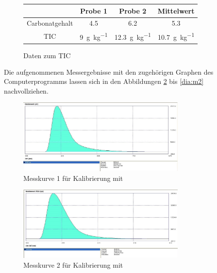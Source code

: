 \vspace*{-7mm}
\begin{figure}[h!]
	\renewcommand{\arraystretch}{1.2}
	\centering
	\caption{Daten zum TIC}
	\label{tab:tic}
	\begin{tabular}{c|c|c|c}
		\hline
		 					& \textbf{Probe 1} 			& \textbf{Probe 2}   		& \textbf{Mittelwert}\\
		\hline
		Carbonatgehalt		&	 \SI{4,5}{\mpercent}		&  \SI{6,2}{\mpercent}		& \SI{5,3}{\mpercent}\\
		TIC					&	\SI{9}{\gram \per \kg}	& \SI{12,3}{\gram \per \kg}	& \SI{10,7}{\gram \per \kg}  \\
		\hline
	\end{tabular}
\end{figure}
\FloatBarrier

\vspace*{5mm}
Die aufgenommenen Messergebnisse mit den zugehörigen Graphen des Computerprogramms lassen sich in den Abbildungen \ref{dia:k1} bis \ref{dia:m2} nachvollziehen.
\begin{figure}[h!]
	\centering
	\includegraphics[width=0.75\textwidth]{img/CaCO3_k1}
	\caption{Messkurve 1 für Kalibrierung mit }
	\label{dia:k1}
\end{figure}
\FloatBarrier

\begin{figure}[h!]
	\centering
	\includegraphics[width=0.75\textwidth]{img/CaCO3_k2}
	\caption{Messkurve 2 für Kalibrierung mit }
	\label{dia:k2}
\end{figure}
\FloatBarrier

